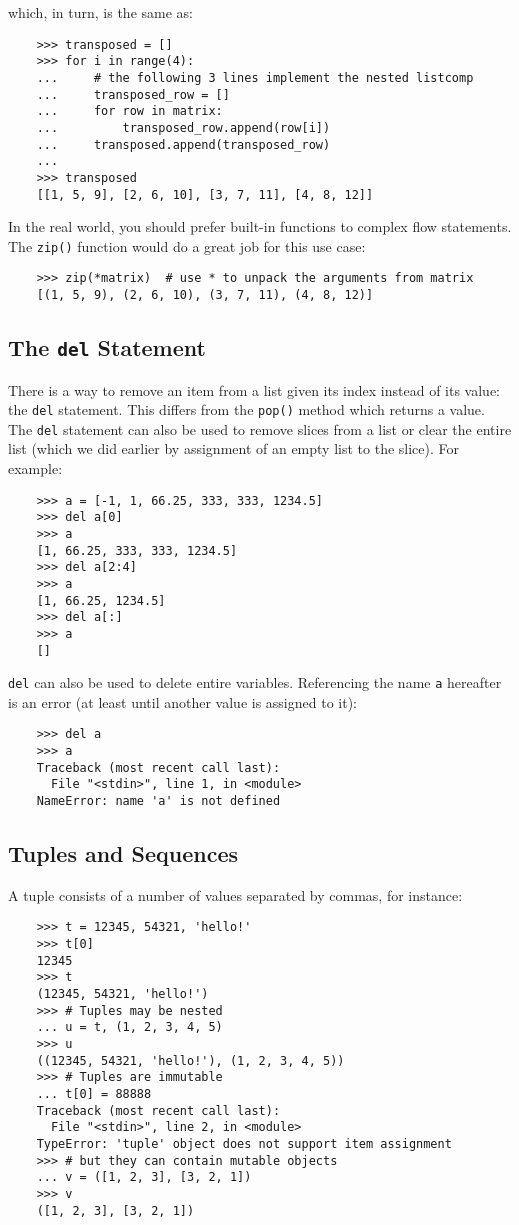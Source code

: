 \documentclass[UTF8]{article}
\begin{document}
which, in turn, is the same as:
\begin{verbatim}
    >>> transposed = []
    >>> for i in range(4):
    ...     # the following 3 lines implement the nested listcomp
    ...     transposed_row = []
    ...     for row in matrix:
    ...         transposed_row.append(row[i])
    ...     transposed.append(transposed_row)
    ...
    >>> transposed
    [[1, 5, 9], [2, 6, 10], [3, 7, 11], [4, 8, 12]]
\end{verbatim}

In the real world, you should prefer built-in functions to complex flow statements. The
\texttt{zip()} function would do a great job for this use case:
\begin{verbatim}
    >>> zip(*matrix)  # use * to unpack the arguments from matrix
    [(1, 5, 9), (2, 6, 10), (3, 7, 11), (4, 8, 12)]
\end{verbatim}

\subsection{The \texttt{del} Statement}
There is a way to remove an item from a list given its index instead of its value: the \texttt{del}
statement. This differs from the \texttt{pop()} method which returns a value. The \texttt{del}
statement can also be used to remove slices from a list or clear the entire list (which we did
earlier by assignment of an empty list to the slice). For example:
\begin{verbatim}
    >>> a = [-1, 1, 66.25, 333, 333, 1234.5]
    >>> del a[0]
    >>> a
    [1, 66.25, 333, 333, 1234.5]
    >>> del a[2:4]
    >>> a
    [1, 66.25, 1234.5]
    >>> del a[:]
    >>> a
    []
\end{verbatim}

\texttt{del} can also be used to delete entire variables. Referencing the name \texttt{a} hereafter
is an error (at least until another value is assigned to it):
\begin{verbatim}
    >>> del a
    >>> a
    Traceback (most recent call last):
      File "<stdin>", line 1, in <module>
    NameError: name 'a' is not defined
\end{verbatim}

\subsection{Tuples and Sequences}
A tuple consists of a number of values separated by commas, for instance:
\begin{verbatim}
    >>> t = 12345, 54321, 'hello!'
    >>> t[0]
    12345
    >>> t
    (12345, 54321, 'hello!')
    >>> # Tuples may be nested
    ... u = t, (1, 2, 3, 4, 5)
    >>> u
    ((12345, 54321, 'hello!'), (1, 2, 3, 4, 5))
    >>> # Tuples are immutable
    ... t[0] = 88888
    Traceback (most recent call last):
      File "<stdin>", line 2, in <module>
    TypeError: 'tuple' object does not support item assignment
    >>> # but they can contain mutable objects
    ... v = ([1, 2, 3], [3, 2, 1])
    >>> v
    ([1, 2, 3], [3, 2, 1])
\end{verbatim}
\end{document}
